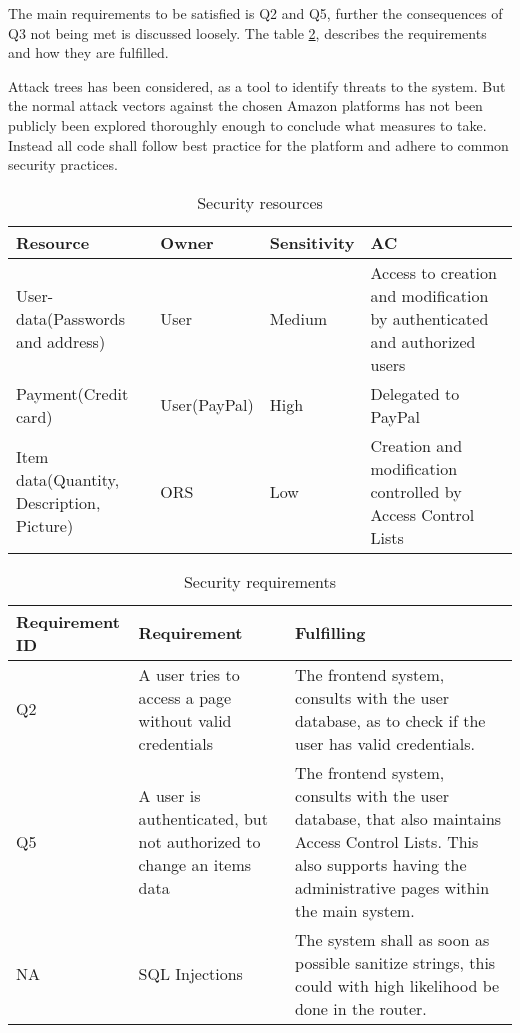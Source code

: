 The main requirements to be satisfied is Q2 and Q5, further the consequences of
Q3 not being met is discussed loosely. The table
\ref{tab:security-requirements}, describes the requirements and how they are
fulfilled.

Attack trees has been considered, as a tool to identify threats to the system.
But the normal attack vectors against the chosen Amazon platforms has not been
publicly been explored thoroughly enough to conclude what measures to take.
Instead all code shall follow best practice for the platform and adhere to
common security practices.

\begin{table}[ht]
    \centering
    \begin{tabular}{p{3cm} | l | l | p{4cm}}
        Resource & Owner & Sensitivity & AC \\ \hline
        User-data(Passwords and address) & User & Medium & Access to creation
            and modification by authenticated and authorized users \\ \hline
        Payment(Credit card) & User(PayPal) & High & Delegated to 
            PayPal \\ \hline
        Item data(Quantity, Description, Picture) & ORS & Low & Creation and
            modification controlled by Access Control Lists \\
    \end{tabular}
    \label{tab:security-resources}
    \caption{Security resources}
\end{table}

\begin{table}[ht]
    \centering
    \begin{tabular}{l | p{5cm} | p{7cm}}
        Requirement ID & Requirement & Fulfilling \\ \hline
        Q2 & A user tries to access a page without valid credentials &
        The frontend system, consults with the user database, as to check if the
        user has valid credentials. \\ \hline
        Q5 & A user is authenticated, but not authorized to change an items
        data & The frontend system, consults with the user database, that also
        maintains Access Control Lists. This also supports having the
        administrative pages within the main system. \\ \hline
        NA & SQL Injections & The system shall as soon as possible sanitize
            strings, this could with high likelihood be done in the router. \\
    \end{tabular}
    \label{tab:security-requirements}
    \caption{Security requirements}
\end{table}

